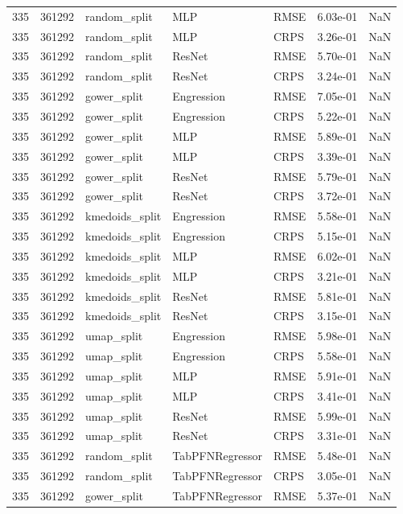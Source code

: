 \begin{tabular}{rrlllrr}
335 & 361292 & random\_split & MLP & RMSE & 6.03e-01 & NaN \\
335 & 361292 & random\_split & MLP & CRPS & 3.26e-01 & NaN \\
335 & 361292 & random\_split & ResNet & RMSE & 5.70e-01 & NaN \\
335 & 361292 & random\_split & ResNet & CRPS & 3.24e-01 & NaN \\
335 & 361292 & gower\_split & Engression & RMSE & 7.05e-01 & NaN \\
335 & 361292 & gower\_split & Engression & CRPS & 5.22e-01 & NaN \\
335 & 361292 & gower\_split & MLP & RMSE & 5.89e-01 & NaN \\
335 & 361292 & gower\_split & MLP & CRPS & 3.39e-01 & NaN \\
335 & 361292 & gower\_split & ResNet & RMSE & 5.79e-01 & NaN \\
335 & 361292 & gower\_split & ResNet & CRPS & 3.72e-01 & NaN \\
335 & 361292 & kmedoids\_split & Engression & RMSE & 5.58e-01 & NaN \\
335 & 361292 & kmedoids\_split & Engression & CRPS & 5.15e-01 & NaN \\
335 & 361292 & kmedoids\_split & MLP & RMSE & 6.02e-01 & NaN \\
335 & 361292 & kmedoids\_split & MLP & CRPS & 3.21e-01 & NaN \\
335 & 361292 & kmedoids\_split & ResNet & RMSE & 5.81e-01 & NaN \\
335 & 361292 & kmedoids\_split & ResNet & CRPS & 3.15e-01 & NaN \\
335 & 361292 & umap\_split & Engression & RMSE & 5.98e-01 & NaN \\
335 & 361292 & umap\_split & Engression & CRPS & 5.58e-01 & NaN \\
335 & 361292 & umap\_split & MLP & RMSE & 5.91e-01 & NaN \\
335 & 361292 & umap\_split & MLP & CRPS & 3.41e-01 & NaN \\
335 & 361292 & umap\_split & ResNet & RMSE & 5.99e-01 & NaN \\
335 & 361292 & umap\_split & ResNet & CRPS & 3.31e-01 & NaN \\
335 & 361292 & random\_split & TabPFNRegressor & RMSE & 5.48e-01 & NaN \\
335 & 361292 & random\_split & TabPFNRegressor & CRPS & 3.05e-01 & NaN \\
335 & 361292 & gower\_split & TabPFNRegressor & RMSE & 5.37e-01 & NaN \\

\end{tabular}

